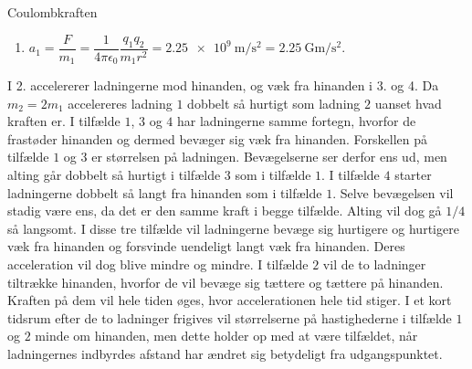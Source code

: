 \documentclass[crop=false, class=memoir]{standalone}
\begin{document}
\begin{opgave}{Coulombkraften}
\begin{enumerate}
        \item $a_1 = \dfrac{F}{m_1} = \dfrac{1}{4\pi\epsilon_0}\dfrac{q_1q_2}{m_1r^2} = \SI{2.25e9}{\metre\per\second\squared} = \SI{2.25}{\giga\metre\per\second\squared}$.
    \end{enumerate}
    I 2. accelererer ladningerne mod hinanden, og væk fra hinanden i 3. og 4.
    \opg Da $m_2 = 2m_1$ accelereres ladning $1$ dobbelt så hurtigt som ladning $2$ uanset hvad kraften er. I tilfælde $1$, $3$ og $4$ har ladningerne samme fortegn, hvorfor de frastøder hinanden og dermed bevæger sig væk fra hinanden. Forskellen på tilfælde $1$ og $3$ er størrelsen på ladningen. Bevægelserne ser derfor ens ud, men alting går dobbelt så hurtigt i tilfælde $3$ som i tilfælde $1$. I tilfælde $4$ starter ladningerne dobbelt så langt fra hinanden som i tilfælde $1$. Selve bevægelsen vil stadig være ens, da det er den samme kraft i begge tilfælde. Alting vil dog gå $1/4$ så langsomt. I disse tre tilfælde vil ladningerne bevæge sig hurtigere og hurtigere væk fra hinanden og forsvinde uendeligt langt væk fra hinanden. Deres acceleration vil dog blive mindre og mindre. I tilfælde $2$ vil de to ladninger tiltrække hinanden, hvorfor de vil bevæge sig tættere og tættere på hinanden. Kraften på dem vil hele tiden øges, hvor accelerationen hele tid stiger. I et kort tidsrum efter de to ladninger frigives vil størrelserne på hastighederne i tilfælde $1$ og $2$ minde om hinanden, men dette holder op med at være tilfældet, når ladningernes indbyrdes afstand har ændret sig betydeligt fra udgangspunktet.
\end{opgave}
\end{document}
